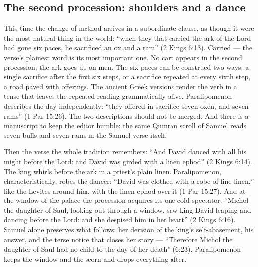 \subsection{The second procession: shoulders and a dance}

This time the change of method arrives in a subordinate clause, as though it
were the most natural thing in the world: ``when they that carried the ark
of the Lord had gone six paces, he sacrificed an ox and a ram'' (2 Kings
6:13). Carried --- the verse's plainest word is its most important one. No
cart appears in the second procession; the ark goes up on men. The six paces
can be construed two ways: a single sacrifice after the first six steps, or
a sacrifice repeated at every sixth step, a road paved with offerings. The
ancient Greek versions render the verb in a tense that leaves the repeated
reading grammatically alive. Paralipomenon describes the
day independently: ``they offered in sacrifice seven oxen, and seven rams''
(1 Par 15:26). The two descriptions should not be merged. And there is a
manuscript to keep the editor humble: the same Qumran scroll of Samuel reads
seven bulls and seven rams in the Samuel verse itself.

Then the verse the whole tradition remembers: ``And David danced with all
his might before the Lord: and David was girded with a linen ephod'' (2
Kings 6:14). The king whirls before the ark in a priest's plain linen.
Paralipomenon, characteristically, robes the dancer: ``David was clothed
with a robe of fine linen,'' like the Levites around him, with the linen
ephod over it (1 Par 15:27). And at the window of the palace the procession
acquires its one cold spectator: ``Michol the daughter of Saul, looking out
through a window, saw king David leaping and dancing before the Lord: and
she despised him in her heart'' (2 Kings 6:16). Samuel alone preserves
what follows: her derision of the king's self-abasement, his answer, and
the terse notice that closes her story --- ``Therefore Michol the
daughter of Saul had no child to the day of her death'' (6:23). Paralipomenon
keeps the window and the scorn and drops everything after.

